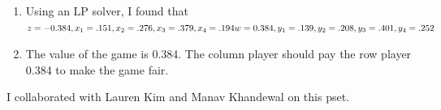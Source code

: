 \documentclass{article}
\begin{document}
\begin{enumerate}
\begin{enumerate}
		\item Using an LP solver, I found that $z = -0.384, x_1 = .151, x_2 = .276, x_3 = .379, x_4 = .194\\
		w = 0.384, y_1 = .139, y_2 = .208, y_3 = .401, y_4 = .252$ \\
		
		\item The value of the game is 0.384. The column player should pay the row player 0.384 to make the game fair.  
	\end{enumerate}
\end{enumerate}

\newpage
I collaborated with Lauren Kim and Manav Khandewal on this pset.  
\end{document}
